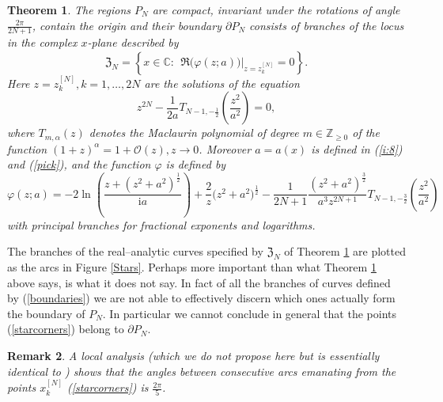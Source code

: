 \documentclass[10pt,reqno,oneside]{amsart}
\newcommand{\im}{\mathrm{i}}
\numberwithin{equation}{section}
\newtheorem{theo}{Theorem}[section]
\newtheorem{remark}[theo]{Remark}
\def\le{\left}
\def\ri{\right}
\def\br{\begin{remark}}
\def\er{\end{remark}}
\def \pa{\partial}
\def\C{{\mathbb C}}
\def\eqref#1{(\ref{#1})}
\def\binom#1#2{\le({#1 \atop #2}\ri)}
\begin{document}
\begin{theo}
\label{thm:boundary}
 The regions  $P_N$ are compact,  invariant under the rotations of angle $\frac {2\pi}{2N+1}$,  contain the origin and their boundary $\partial P_N$ consists of branches of the locus in the complex $x$-plane described by 
\begin{equation}\label{boundaries}
\mathfrak Z_N= \le\{ x\in\C: \ \ \Re\big(\varphi(z;a)\big)\Big|_{z=z_k^{[N]}}=0\ri\}.
\end{equation}
Here  $z=z_k^{[N]},k=1,\ldots,2N$ are the solutions of the equation
\begin{equation*}
	z^{2N}-\frac{1}{2a}T_{N-1,-\frac{1}{2}}\left(\frac{z^2}{a^2}\right)=0, %
\end{equation*}
where $T_{m,\alpha}(z)$ denotes the Maclaurin polynomial of degree $m\in\mathbb{Z}_{\geq 0}$ of the function $(1+z)^{\alpha}=1+\mathcal{O}(z),z\rightarrow 0$.
Moreover  $a=a(x)$ is defined in \eqref{i:8} and \eqref{pick}, and the function $\varphi$ is defined by
\begin{equation*}
	\varphi(z;a)=-2\ln\left(\frac{z+(z^2+a^2)^{\frac{1}{2}}}{\im a}\right)+\frac{2}{z}\big(z^2+a^2\big)^{\frac{1}{2}}-\frac{1}{2N+1}\frac{(z^2+a^2)^{\frac{3}{2}}}{a^3z^{2N+1}} T_{N-1,-\frac{3}{2}}\left(\frac{z^2}{a^2}\right)%
\end{equation*}
with principal branches for fractional exponents and logarithms. 
\end{theo}
The branches of the real--analytic curves specified by $\mathfrak Z_N$ of Theorem \ref{thm:boundary} are plotted as the arcs in Figure \ref{Stars}. Perhaps more important than what Theorem \ref{thm:boundary} above says, is what it does not say. In fact of all the branches of curves defined by \eqref{boundaries} we are not able to effectively discern which ones actually form the boundary of $P_N$. In particular we cannot conclude in general that the points \eqref{starcorners} belong to $\pa P_N$. 
\br
A local analysis (which we do not propose here but is essentially identical to \cite{BB}) shows that the angles between consecutive  arcs emanating from the points $x_{k}^{[N]}$ \eqref{starcorners}  is $\frac {2\pi}5$.
\er
\end{document}
